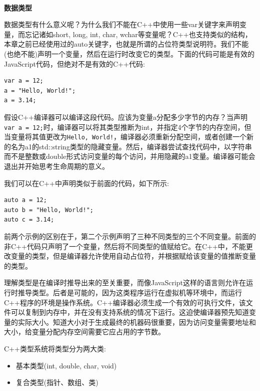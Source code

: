 \noindent\textbf{}\ \par
\textbf{数据类型} \ \par
数据类型有什么意义呢？为什么我们不能在C++中使用一些var关键字来声明变量，而忘记诸如short, long, int, char, wchar等变量呢？C++也支持类似的结构，本章之前已经使用过的auto关键字，也就是所谓的占位符类型说明符。我们不能(也绝不能)声明一个变量，然后在运行时改变它的类型。下面的代码可能是有效的JavaScript代码，但绝对不是有效的C++代码: \par

\begin{lstlisting}[caption={}]
var a = 12;
a = "Hello, World!";
a = 3.14;
\end{lstlisting}

假设C++编译器可以编译这段代码。应该为变量a分配多少字节的内存？当声明\texttt{var a = 12;}时，编译器可以将其类型推断为int，并指定4个字节的内存空间，但当变量将其值更改为\texttt{Hello, World!}，编译器必须重新分配空间，或者创建一个新的名为a1的std::string类型的隐藏变量。然后，编译器尝试查找代码中，以字符串而不是整数或double形式访问变量的每个访问，并用隐藏的a1变量。编译器可能会退出并开始思考生命周期的意义。 \par
我们可以在C++中声明类似于前面的代码，如下所示: \par

\begin{lstlisting}[caption={}]
auto a = 12;
auto b = "Hello, World!";
auto c = 3.14;
\end{lstlisting}

前两个示例的区别在于，第二个示例声明了三种不同类型的三个不同变量。前面的非C++代码只声明了一个变量，然后将不同类型的值赋给它。在C++中，不能更改变量的类型，但是编译器允许使用自动占位符，并根据赋给该变量的值推断变量的类型。\par
理解类型是在编译时推导出来的至关重要，而像JavaScript这样的语言则允许在运行时推导类型。后者是可能的，因为这类程序运行在虚拟机等环境中，而运行C++程序的环境是操作系统。C++编译器必须生成一个有效的可执行文件，该文件可以复制到内存中，并在没有支持系统的情况下运行。这迫使编译器预先知道变量的实际大小。知道大小对于生成最终的机器码很重要，因为访问变量需要地址和大小，给变量分配内存空间需要它应占用的字节数。 \par
C++类型系统将类型分为两大类: \par

\begin{itemize}
	\item 基本类型(int, double, char, void)
	\item 复合类型(指针、数组、类)
\end{itemize}

